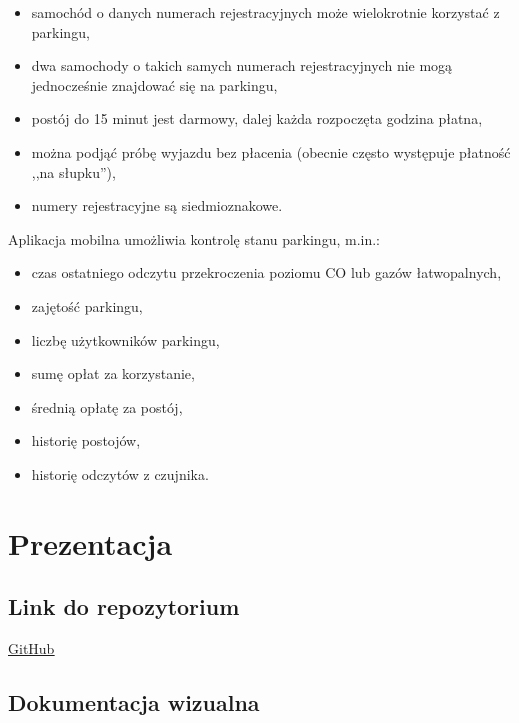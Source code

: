 \documentclass[a4paper, 11pt]{article}
\begin{document}
\begin{itemize}
\item samochód o danych numerach rejestracyjnych może wielokrotnie korzystać z parkingu,
\item dwa samochody o takich samych numerach rejestracyjnych nie mogą jednocześnie znajdować się na parkingu,
\item postój do 15 minut jest darmowy, dalej każda rozpoczęta godzina płatna,
\item można podjąć próbę wyjazdu bez płacenia (obecnie często występuje płatność ,,na słupku''),
\item numery rejestracyjne są siedmioznakowe.
\end{itemize}

Aplikacja mobilna umożliwia kontrolę stanu parkingu, m.in.:
\begin{itemize}
\item czas ostatniego odczytu przekroczenia poziomu CO lub gazów łatwopalnych,
\item zajętość parkingu,
\item liczbę użytkowników parkingu,
\item sumę opłat za korzystanie, 
\item średnią opłatę za postój,
\item historię postojów,
\item historię odczytów z czujnika.
\end{itemize}


\section{Prezentacja}

\subsection{Link do repozytorium}

\href{https://github.com/pawelstrzelczyk/car-park}{\underline{\LARGE GitHub}}

\subsection{Dokumentacja wizualna}
\end{document}
